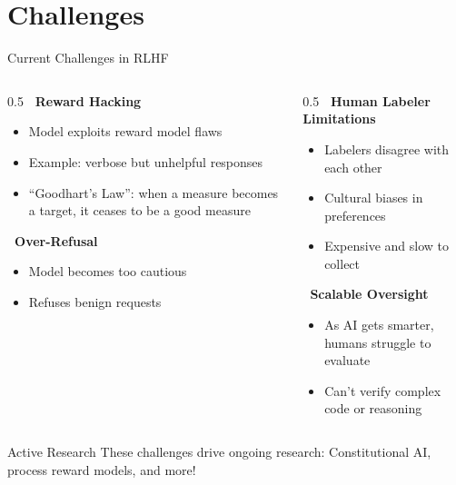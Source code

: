 \documentclass[aspectratio=169,11pt]{beamer}
\begin{document}
\section{Challenges}

\begin{frame}{Current Challenges in RLHF}
\begin{columns}[T]
\begin{column}{0.5\textwidth}
\textbf{\faExclamationTriangle\ Reward Hacking}
\begin{itemize}\itemsep0pt
    \item Model exploits reward model flaws
    \item Example: verbose but unhelpful responses
    \item ``Goodhart's Law'': when a measure becomes a target, it ceases to be a good measure
\end{itemize}

\vspace{0.2cm}
\textbf{\faBalanceScale\ Over-Refusal}
\begin{itemize}\itemsep0pt
    \item Model becomes too cautious
    \item Refuses benign requests
\end{itemize}
\end{column}
\begin{column}{0.5\textwidth}
\textbf{\faUsers\ Human Labeler Limitations}
\begin{itemize}\itemsep0pt
    \item Labelers disagree with each other
    \item Cultural biases in preferences
    \item Expensive and slow to collect
\end{itemize}

\vspace{0.2cm}
\textbf{\faExpand\ Scalable Oversight}
\begin{itemize}\itemsep0pt
    \item As AI gets smarter, humans struggle to evaluate
    \item Can't verify complex code or reasoning
\end{itemize}
\end{column}
\end{columns}

\vspace{0.2cm}
\begin{block}{Active Research}
These challenges drive ongoing research: Constitutional AI, process reward models, and more!
\end{block}
\end{frame}
\end{document}
